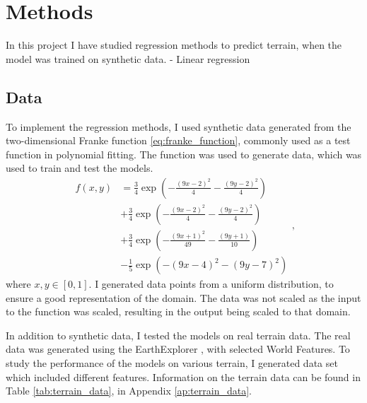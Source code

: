 \section{Methods}\label{sec:methods}
In this project I have studied regression methods to predict terrain, when the model was trained on synthetic data.  
- Linear regression
\subsection{Data}\label{ssec:data}
To implement the regression methods, I used synthetic data generated from the two-dimensional Franke function \eqref{eq:franke_function}, commonly used as a test function in polynomial fitting. The function was used to generate data, which was used to train and test the models. 
\begin{equation}\label{eq:franke_function}
\begin{split}
    f(x, y) &= \frac{3}{4} \exp(- \frac{(9x-2)^{2}}{4} - \frac{(9y-2)^{2}}{4} ) \\
    &+ \frac{3}{4} \exp(- \frac{(9x-2)^{2}}{4} - \frac{(9y-2)^{2}}{4} ) \\
    &+ \frac{3}{4} \exp(- \frac{(9x+1)^{2}}{49} - \frac{(9y+1)}{10} ) \\ 
    &- \frac{1}{5} \exp(- (9x-4)^{2} - (9y-7)^{2} ) 
\end{split}, 
\end{equation}
where $x, y \in [0, 1]$. I generated data points from a uniform distribution, to ensure a good representation of the domain. The data was not scaled as the input to the function was scaled, resulting in the output being scaled to that domain.

In addition to synthetic data, I tested the models on real terrain data. The real data was generated using the EarthExplorer \cite{usgov:2024:earthexplorer}, with selected World Features. To study the performance of the models on various terrain, I generated data set which included different features. Information on the terrain data can be found in Table \ref{tab:terrain_data}, in Appendix \ref{ap:terrain_data}.

